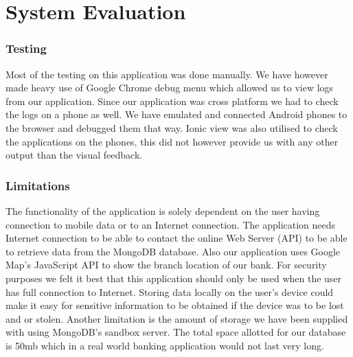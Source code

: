  



\chapter{System Evaluation}
\subsection{Testing}
    Most of the testing on this application was done manually. We have however made heavy use of Google Chrome debug menu which allowed us to view logs from our application.
    Since our application was cross platform we had to check the logs on a phone as well. We have emulated and connected Android phones to the browser and debugged them that way. 
    Ionic view was also utilised to check the applications on the phones, this did not however provide us with any other output than the visual feedback.

\subsection{Limitations}
The functionality of the application is solely dependent on the user having connection to mobile data or to an Internet connection. The application needs Internet connection to be able to contact the online Web Server (API) to be able to retrieve data from the MongoDB database. Also our application uses Google Map’s JavaScript API to show the branch location of our bank. For security purposes we felt it best that this application should only be used when the user has full connection to Internet. Storing data locally on the user's device could make it easy for sensitive information to be obtained if the device was to be lost and or stolen. Another limitation is the amount of storage we have been supplied with using MongoDB's sandbox server. The total space allotted for our database is 50mb which in a real world banking application would not last very long. 

